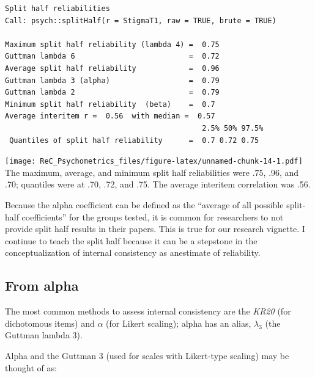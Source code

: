\documentclass[
  english,
]{book}
\newenvironment{Shaded}{\begin{snugshade}}{\end{snugshade}}
\newcommand{\AttributeTok}[1]{\textcolor[rgb]{0.77,0.63,0.00}{#1}}
\newcommand{\DecValTok}[1]{\textcolor[rgb]{0.00,0.00,0.81}{#1}}
\newcommand{\FunctionTok}[1]{\textcolor[rgb]{0.00,0.00,0.00}{#1}}
\newcommand{\NormalTok}[1]{#1}
\newcommand{\SpecialCharTok}[1]{\textcolor[rgb]{0.00,0.00,0.00}{#1}}
\newcommand{\StringTok}[1]{\textcolor[rgb]{0.31,0.60,0.02}{#1}}
\begin{document}
\begin{verbatim}
Split half reliabilities  
Call: psych::splitHalf(r = StigmaT1, raw = TRUE, brute = TRUE)

Maximum split half reliability (lambda 4) =  0.75
Guttman lambda 6                          =  0.72
Average split half reliability            =  0.96
Guttman lambda 3 (alpha)                  =  0.79
Guttman lambda 2                          =  0.79
Minimum split half reliability  (beta)    =  0.7
Average interitem r =  0.56  with median =  0.57
                                             2.5% 50% 97.5%
 Quantiles of split half reliability      =  0.7 0.72 0.75
\end{verbatim}

\begin{Shaded}
\end{Shaded}

\texttt{[image: ReC\_Psychometrics\_files/figure-latex/unnamed-chunk-14-1.pdf]}
The maximum, average, and minimum split half reliabilities were .75, .96, and .70; quantiles were at .70, .72, and .75. The average interitem correlation was .56.

Because the alpha coefficient can be defined as the ``average of all possible split-half coefficients'' for the groups tested, it is common for researchers to not provide split half results in their papers. This is true for our research vignette. I continue to teach the split half because it can be a stepstone in the conceptualization of internal consistency as anestimate of reliability.

\hypertarget{from-alpha}{%
\subsection{From alpha}\label{from-alpha}}

The most common methods to assess internal consistency are the \emph{KR20} (for dichotomous items) and \(\alpha\) (for Likert scaling); alpha has an alias, \(\lambda _{3}\) (the Guttman lambda 3).

Alpha and the Guttman 3 (used for scales with Likert-type scaling) may be thought of as:
\end{document}
